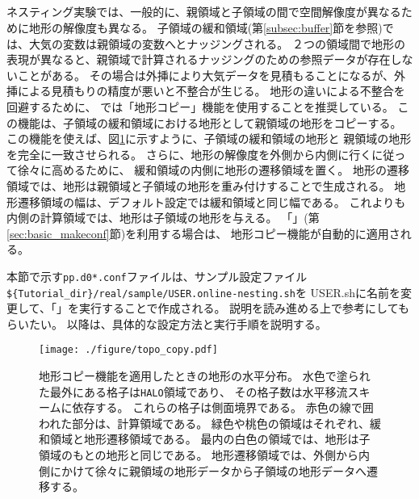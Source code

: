 \subsection{\SubsecCopyTopo} \label{subsec:nest_topo}
ネスティング実験では、一般的に、親領域と子領域の間で空間解像度が異なるために地形の解像度も異なる。
子領域の緩和領域(第\ref{subsec:buffer}節を参照)では、大気の変数は親領域の変数へとナッジングされる。
２つの領域間で地形の表現が異なると、親領域で計算されるナッジングのための参照データが存在しないことがある。
その場合は外挿により大気データを見積もることになるが、外挿による見積もりの精度が悪いと不整合が生じる。
%
地形の違いによる不整合を回避するために、
\scalerm では「地形コピー」機能を使用することを推奨している。
この機能は、子領域の緩和領域における地形として親領域の地形をコピーする。
この機能を使えば、図\ref{fig_topocopy}に示すように、子領域の緩和領域の地形と
親領域の地形を完全に一致させられる。
さらに、地形の解像度を外側から内側に行くに従って徐々に高めるために、
緩和領域の内側に地形の遷移領域を置く。
地形の遷移領域では、地形は親領域と子領域の地形を重み付けすることで生成される。
地形遷移領域の幅は、デフォルト設定では緩和領域と同じ幅である。
これよりも内側の計算領域では、地形は子領域の地形を与える。
「{\makeconftool}」(第\ref{sec:basic_makeconf}節)を利用する場合は、
地形コピー機能が自動的に適用される。


本節で示す\verb|pp.d0*.conf|ファイルは、サンプル設定ファイル\\
\verb|${Tutorial_dir}/real/sample/USER.online-nesting.sh|を
USER.shに名前を変更して、「{\makeconftool}」を実行することで作成される。
説明を読み進める上で参考にしてもらいたい。
以降は、具体的な設定方法と実行手順を説明する。


\begin{figure}[htb]
\begin{center}
  \texttt{[image: ./figure/topo\_copy.pdf]}\\
  \caption{地形コピー機能を適用したときの地形の水平分布。
水色で塗られた最外にある格子は\texttt{HALO}領域であり、
その格子数は水平移流スキームに依存する。
これらの格子は側面境界である。
赤色の線で囲われた部分は、計算領域である。
緑色や桃色の領域はそれぞれ、緩和領域と地形遷移領域である。
最内の白色の領域では、地形は子領域のもとの地形と同じである。
地形遷移領域では、外側から内側にかけて徐々に親領域の地形データから子領域の地形データへ遷移する。}
  \label{fig_topocopy}
\end{center}
\end{figure}


